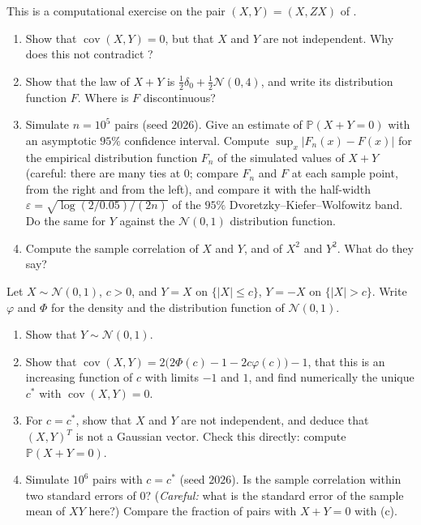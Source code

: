 \begin{exercise}\label{ex:gv-random-sign}
\easy This is a computational exercise on the pair $(X,Y)=(X,ZX)$ of .
\begin{enumerate}[label=(\alph*)]
  \item Show that $\operatorname{cov}(X,Y)=0$, but that $X$ and $Y$ are not independent. Why does
    this not contradict ?
  \item Show that the law of $X+Y$ is $\frac12\delta_0+\frac12\mathcal N(0,4)$, and write its
    distribution function $F$. Where is $F$ discontinuous?
  \item Simulate $n=10^5$ pairs (seed $2026$). Give an estimate of $\mathbb P(X+Y=0)$ with an
    asymptotic $95\%$ confidence interval. Compute $\sup_x|F_n(x)-F(x)|$ for the empirical
    distribution function $F_n$ of the simulated values of $X+Y$ (careful: there are many ties at
    $0$; compare $F_n$ and $F$ at each sample point, from the right and from the left), and compare
    it with the half-width $\varepsilon=\sqrt{\log(2/0.05)/(2n)}$ of the $95\%$
    Dvoretzky--Kiefer--Wolfowitz band. Do the same for $Y$ against the $\mathcal N(0,1)$ distribution
    function.
  \item Compute the sample correlation of $X$ and $Y$, and of $X^2$ and $Y^2$. What do they say?
\end{enumerate}
\end{exercise}

\begin{exercise}\label{ex:gv-sign-flip}
\medium Let $X\sim\mathcal N(0,1)$, $c>0$, and $Y=X$ on $\{|X|\le c\}$, $Y=-X$ on $\{|X|>c\}$.
Write $\varphi$ and $\Phi$ for the density and the distribution function of $\mathcal N(0,1)$.
\begin{enumerate}[label=(\alph*)]
  \item Show that $Y\sim\mathcal N(0,1)$.
  \item Show that $\operatorname{cov}(X,Y)=2\big(2\Phi(c)-1-2c\varphi(c)\big)-1$, that this is an
    increasing function of $c$ with limits $-1$ and $1$, and find numerically the unique $c^*$ with
    $\operatorname{cov}(X,Y)=0$.
  \item For $c=c^*$, show that $X$ and $Y$ are not independent, and deduce that $(X,Y)^T$ is not a
    Gaussian vector. Check this directly: compute $\mathbb P(X+Y=0)$.
  \item Simulate $10^6$ pairs with $c=c^*$ (seed $2026$). Is the sample correlation within two
    standard errors of $0$? (\emph{Careful:} what is the standard error of the sample mean of $XY$
    here?) Compare the fraction of pairs with $X+Y=0$ with (c).
\end{enumerate}
\end{exercise}

